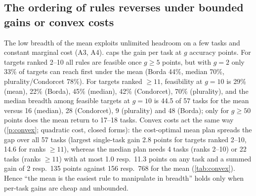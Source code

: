 \documentclass{article}
\theoremstyle{plain}
\theoremstyle{definition}
\theoremstyle{remark}
\newcommand{\Bst}{B^{\ast}}
\begin{document}
\begin{table}[t]
\caption{HELM-MMLU: investment by initial-rank group (median over target models; IQR of $B/n$). $D$ in questions (of 14{,}042); $P$ in accuracy points summed over tasks. Under plurality most models have no first place and tie, hence the uneven group sizes.}\label{tab:bins}
\centering\scriptsize\setlength{\tabcolsep}{2.5pt}

\end{table}
\begin{table}[t]
\caption{Tightness of the analytic bounds on $\Bst$ (HELM, ceiling): fraction of non-leader targets with equality, median excess, and violations.}\label{tab:bounds}
\centering\scriptsize

\end{table}
\begin{table}[t]
\caption{Paired comparison with the mean on the same targets (non-leaders under both rules; 78, plurality 77): median breadth and data volume under the rule and under the mean, median paired difference with 95\% bootstrap CI, and fraction of targets for which the rule is cheaper/costlier.}\label{tab:paired}
\centering\small\setlength{\tabcolsep}{3pt}

\end{table}

\subsection{The ordering of rules reverses under bounded gains or convex costs}\label{sec:convex}
The low breadth of the mean exploits unlimited headroom on a few tasks and constant marginal cost (A3, A4).  caps the gain per task at $g$ accuracy points.
For targets ranked 2--10 all rules are feasible once $g\ge5$ points, but with $g=2$ only 33\% of targets can reach first under the mean (Borda 44\%, median 70\%, plurality/Condorcet 78\%). For targets ranked $\ge11$, feasibility at $g=10$ is 29\% (mean), 22\% (Borda), 45\% (median), 42\% (Condorcet), 70\% (plurality), and the median breadth among feasible targets at $g=10$ is 44.5 of 57 tasks for the mean versus 16 (median), 28 (Condorcet), 9 (plurality) and 48 (Borda); only for $g\ge50$ points does the mean return to 17--18 tasks.
Convex costs act the same way (\cref{p:convex}; quadratic cost, closed forms): the cost-optimal mean plan spreads the gap over all 57 tasks (largest single-task gain 2.8 points for targets ranked 2--10, 14.6 for ranks $\ge11$), whereas the median plan needs 4 tasks (ranks 2--10) or 22 tasks (ranks $\ge11$) with at most 1.0 resp.\ 11.3 points on any task and a summed gain of 2 resp.\ 135 points against 156 resp.\ 768 for the mean (\cref{tab:convex}).
Hence ``the mean is the easiest rule to manipulate in breadth'' holds only when per-task gains are cheap and unbounded.
\end{document}
